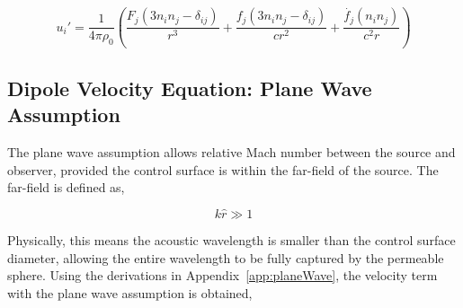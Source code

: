 



\begin{equation}
    u_i'=\frac{1}{4\pi\rho_0} \left( 
    \frac{F_j(3n_in_j-\delta_{ij})}{r^3} +
    \frac{f_j(3n_in_j - \delta_{ij})}{cr^2} +
    \frac{\dot{f_j}(n_in_j)}{c^2r}
    \right)
    \label{eq:dipole_u1}
\end{equation}


\subsection{Dipole Velocity Equation: Plane Wave Assumption} \label{subsubsec:dipole_u2}

The plane wave assumption allows relative Mach number between the source and observer, provided the control surface is within the far-field of the source. The far-field is defined as,

\begin{equation}
    k\hat{r} \gg 1
    \label{eq:far_field_def}
\end{equation}

Physically, this means the acoustic wavelength is smaller than the control surface diameter, allowing the entire wavelength to be fully captured by the permeable sphere. Using the derivations in Appendix~\ref{app:planeWave}, the velocity term with the plane wave assumption is obtained,

